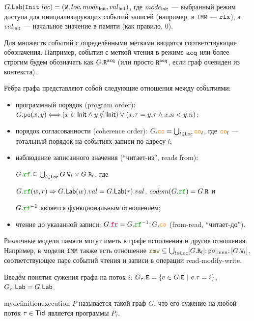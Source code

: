 \documentclass[14pt]{matmex-diploma-custom}
\newcommand{\IMM}{\mathtt{IMM}}
\begin{document}
$G.\mathsf{Lab}(\mathtt{Init}\ loc) = ({\mathtt{W}}, loc, mode_{\mathsf{Init}}, val_{\mathsf{Init}})$, где $mode_{\mathsf{Init}}$ --- выбранный режим доступа для инициализирующих событий записей (например, в $\IMM$ --- $\mathtt{rlx}$), а $val_{\mathsf{Init}}$ --- начальное значение в памяти (как правило, 0).

Для множеств событий с определёнными метками вводятся соответствующие обозначения. Например, события с меткой чтения в режиме ${\mathtt{acq}}$ или более строгим будем обозначать как $G.{\mathtt{R}}^{{\mathtt{acq}}}$ (или просто ${\mathtt{R}}^{{\mathtt{acq}}}$, если граф очевиден из контекста).

Рёбра графа представляют собой следующие отношения между событиями:
\begin{itemize}
\item программный порядок (program order): $G.\lPO(x, y)\!\! \iff \!\! (x\in \Init \land y\notin \Init) \lor (x.\tau = y.\tau \land x.n<y.n)$;
\item порядок согласованности (coherence order): $G.\lCO = \bigcup_{l\in \Loc} \lCO_l$, где $\lCO_l$ --- тотальный порядок на событиях записи по адресу $l$;
\item наблюдение записанного значения (``читает-из'', reads from):

  $G.\lRF \subseteq \bigcup_{l\in \Loc} G.\lW_l \times G.\lR_l$, где

  $G.\lRF(w, r)\implies G.\Lab(w).val = G.\Lab(r).val$, $codom(G.\lRF) = G.\lR$ и

  $G.\lRF^{-1}$ является функциональным отношением;
\item чтение до указанной записи: $G.\lFR = G.\lRF^{-1}; G.\lCO$ (from-read, ``читает-\allowbreak до'').
\end{itemize}  

Различные модели памяти могут иметь в графе исполнения и другие отношения. Например, в модели $\IMM$ также есть отношение $\lRMW \subseteq \bigcup_{l\in \Loc}[G.\lR_l];\imm\lPO;[G.\lW_l]$, соответствующее паре событий чтения и записи в операции read-modify-write. 

Введём понятия сужения графа на поток $i$: $G_\tau.{\mathtt{E}} = \{e\in G.{\mathtt{E}}\ |\ e.\tau = i\}$, $G_\tau.\mathsf{Lab} = G.\mathsf{Lab}$.

\begin{restatable}{mydefinition}{execution}
 $P$ называется такой граф $G$, что его сужение на любой поток $\tau\in \mathsf{Tid}$ является  программы $P_\tau$.
\end{restatable}
\end{document}

